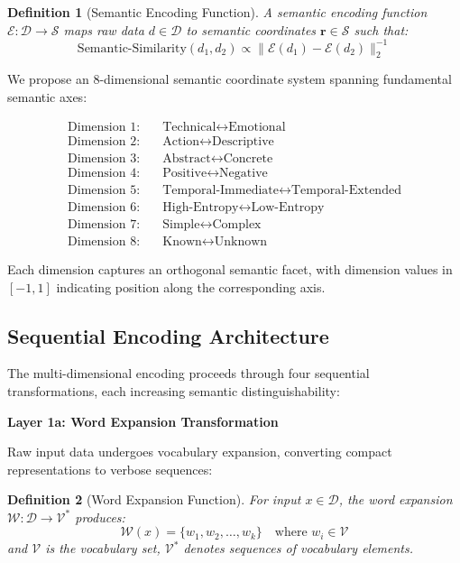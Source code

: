 \documentclass[12pt,a4paper]{article}
\newtheorem{definition}{Definition}
\begin{document}
\begin{definition}[Semantic Encoding Function]
A semantic encoding function $\mathcal{E}: \mathcal{D} \to \mathcal{S}$ maps raw data $d \in \mathcal{D}$ to semantic coordinates $\mathbf{r} \in \mathcal{S}$ such that:
\begin{equation}
\text{Semantic-Similarity}(d_1, d_2) \propto \|\mathcal{E}(d_1) - \mathcal{E}(d_2)\|_2^{-1}
\end{equation}
\end{definition}

We propose an 8-dimensional semantic coordinate system spanning fundamental semantic axes:

\begin{align}
\text{Dimension 1:} \quad &\text{Technical} \leftrightarrow \text{Emotional} \\
\text{Dimension 2:} \quad &\text{Action} \leftrightarrow \text{Descriptive} \\
\text{Dimension 3:} \quad &\text{Abstract} \leftrightarrow \text{Concrete} \\
\text{Dimension 4:} \quad &\text{Positive} \leftrightarrow \text{Negative} \\
\text{Dimension 5:} \quad &\text{Temporal-Immediate} \leftrightarrow \text{Temporal-Extended} \\
\text{Dimension 6:} \quad &\text{High-Entropy} \leftrightarrow \text{Low-Entropy} \\
\text{Dimension 7:} \quad &\text{Simple} \leftrightarrow \text{Complex} \\
\text{Dimension 8:} \quad &\text{Known} \leftrightarrow \text{Unknown}
\end{align}

Each dimension captures an orthogonal semantic facet, with dimension values in $[-1, 1]$ indicating position along the corresponding axis.

\subsection{Sequential Encoding Architecture}

The multi-dimensional encoding proceeds through four sequential transformations, each increasing semantic distinguishability:

\textbf{Layer 1a: Word Expansion Transformation}

Raw input data undergoes vocabulary expansion, converting compact representations to verbose sequences:

\begin{definition}[Word Expansion Function]
For input $x \in \mathcal{D}$, the word expansion $\mathcal{W}: \mathcal{D} \to \mathcal{V}^*$ produces:
\begin{equation}
\mathcal{W}(x) = \{w_1, w_2, \ldots, w_k\} \quad \text{where } w_i \in \mathcal{V}
\end{equation}
and $\mathcal{V}$ is the vocabulary set, $\mathcal{V}^*$ denotes sequences of vocabulary elements.
\end{definition}
\end{document}

